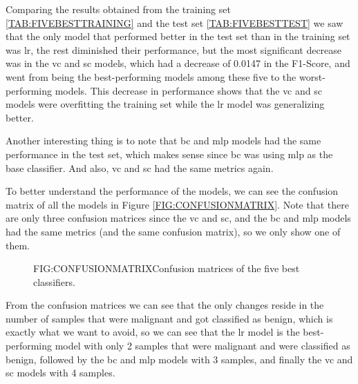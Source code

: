 Comparing the results obtained from the training set \ref{TAB:FIVEBESTTRAINING} and the test set \ref{TAB:FIVEBESTTEST} we saw that the only model that performed better in the test set than in the training set was \acl{lr}, the rest diminished their performance, but the most significant decrease was in the \acl{vc} and \acl{sc} models, which had a decrease of 0.0147 in the F1-Score, and went from being the best-performing models among these five to the worst-performing models. This decrease in performance shows that the \acl{vc} and \acl{sc} models were overfitting the training set while the \acl{lr} model was generalizing better. 

Another interesting thing is to note that \ac{bc} and \ac{mlp} models had the same performance in the test set, which makes sense since \ac{bc} was using \ac{mlp} as the base classifier. And also, \ac{vc} and \ac{sc} had the same metrics again.

To better understand the performance of the models, we can see the confusion matrix of all the models in Figure \ref{FIG:CONFUSIONMATRIX}. Note that there are only three confusion matrices since the \ac{vc} and \ac{sc}, and the \ac{bc} and \ac{mlp} models had the same metrics (and the same confusion matrix), so we only show one of them.

\begin{figure}[Confusion Matrix]{FIG:CONFUSIONMATRIX}{Confusion matrices of the five best classifiers.}
    \begin{adjustbox}{width=1\textwidth,height=\textheight,keepaspectratio}
\end{adjustbox}
\end{figure}

From the confusion matrices we can see that the only changes reside in the number of samples that were malignant and got classified as benign, which is exactly what we want to avoid, so we can see that the \ac{lr} model is the best-performing model with only 2 samples that were malignant and were classified as benign, followed by the \ac{bc} and \ac{mlp} models with 3 samples, and finally the \ac{vc} and \ac{sc} models with 4 samples.